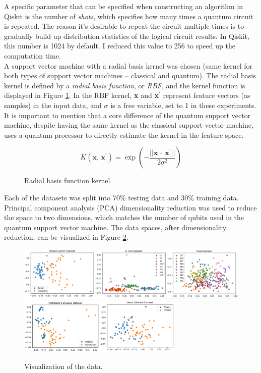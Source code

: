 \documentclass{article}
\begin{document}
  A specific parameter that can be specified when constructing an algorithm in Qiskit is the number of \textit{shots}, which specifies how many times a quantum circuit is repeated. The reason it's desirable to repeat the circuit multiple times is to gradually build up distribution statistics of the logical circuit results. In Qiskit, this number is 1024 by default. I reduced this value to 256 to speed up the computation time. \\

  A support vector machine with a radial basis kernel was chosen (same kernel for both types of support vector machines -- classical and quantum). The radial basis kernel is defined by a \textit{radial basis function}, or \textit{RBF}, and the kernel function is displayed in Figure \ref{fig:kernel}. In the RBF kernel, \textbf{x} and \textbf{x}$^\prime$ represent feature vectors (as samples) in the input data, and $\sigma$ is a free variable, set to 1 in these experiments. It is important to mention that a core difference of the quantum support vector machine, despite having the same kernel as the classical support vector machine, uses a quantum processor to directly estimate the kernel in the feature space.

  \begin{figure}[h]
    \[ K(\textbf{x,~x}^\prime) = \exp(- \frac{||\textbf{x - x}^\prime||}{2 \sigma^2}) \]
    \caption{\label{fig:kernel}Radial basis function kernel.}
  \end{figure}

  Each of the datasets was split into 70\% testing data and 30\% training data. Principal component analysis (PCA) dimensionality reduction was used to reduce the space to two dimensions, which matches the number of qubits used in the quantum support vector machine. The data spaces, after dimensionality reduction, can be visualized in Figure \ref{fig:data}. \\

  \begin{figure}[h]
    \centering
    \includegraphics[width=1\textwidth]{img/vis1.png}
    \includegraphics[width=0.7\textwidth]{img/vis2.png}
    \caption{\label{fig:data}Visualization of the data.}
  \end{figure}
\end{document}
